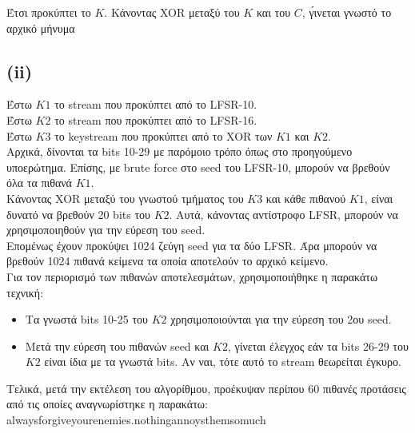 \documentclass[a4paper, 11pt]{article}
\newcommand{\lt}{\latintext}
\begin{document}
Έτσι προκύπτει το $K$. Κάνοντας {\lt XOR} μεταξύ του $K$ και του $C$, γ́ινεται γνωστό το αρχικό μήνυμα

\newpage
\subsection*{{\lt (ii)}}
Έστω $K1$ το {\lt stream} που προκύπτει από το {\lt LFSR-10}.\\
Έστω $K2$ το {\lt stream} που προκύπτει από το {\lt LFSR-16}.\\
Έστω $K3$ το {\lt keystream} που προκύπτει από το {\lt XOR} των $K1$ και $K2$.\\

Αρχικά, δίνονται τα {\lt bits} 10-29 με παρόμοιο τρόπο όπως στο προηγούμενο υποερώτημα. Επίσης, με {\lt brute force} στο {\lt seed} του {\lt LFSR-10}, μπορούν να βρεθούν όλα τα πιθανά $K1$.\\

Κάνοντας {\lt XOR} μεταξύ του γνωστού τμήματος του $K3$ και κάθε πιθανού $K1$, είναι δυνατό να βρεθούν 20 {\lt bits} του $K2$. Αυτά, κάνοντας αντίστροφο {\lt LFSR}, μπορούν να χρησιμοποιηθούν για την εύρεση του {\lt seed}.\\

Επομένως έχουν προκύψει 1024 ζεύγη {\lt seed} για τα δύο {\lt LFSR}. Άρα μπορούν να βρεθούν 1024 πιθανά κείμενα τα οποία αποτελούν το αρχικό κείμενο.\\

Για τον περιορισμό των πιθανών αποτελεσμάτων, χρησιμοποιήθηκε η παρακάτω τεχνική:
\begin{itemize}
	\item Τα γνωστά {\lt bits} 10-25 του $K2$ χρησιμοποιούνται για την εύρεση του 2ου {\lt seed}.
	\item Μετά την εύρεση του πιθανών {\lt seed} και $Κ2$, γίνεται έλεγχος εάν τα {\lt bits} 26-29 του $K2$ είναι ίδια με τα γνωστά {\lt bits}. Αν ναι, τότε αυτό το {\lt stream} θεωρείται έγκυρο.
\end{itemize}

Τελικά, μετά την εκτέλεση του αλγορίθμου, προέκυψαν περίπου 60 πιθανές προτάσεις από τις οποίες αναγνωρίστηκε η παρακάτω:\\
{\lt alwaysforgiveyourenemies.nothingannoysthemsomuch}
\end{document}
